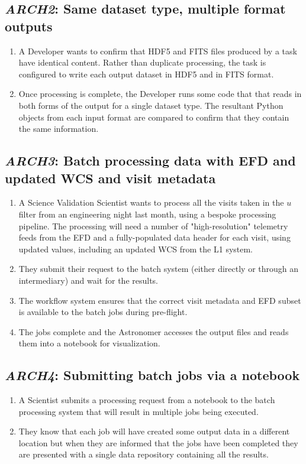 \documentclass[DM,toc,lsstdraft]{lsstdoc}
\newcommand{\usecase}[3]{%
\subsection{\emph{#1}: #2}
\label{use:#1}
\begin{enumerate}[label=\alph*.]
#3
\end{enumerate}
}
\begin{document}
\usecase{ARCH2}{Same dataset type, multiple format outputs}{%

\item
A Developer wants to confirm that HDF5 and FITS files produced by a task have identical content.
Rather than duplicate processing, the task is configured to write each output dataset in HDF5 and in FITS format.

\item
Once processing is complete, the Developer runs some code that that reads in both forms of the output for a single dataset type.
The resultant Python objects from each input format are compared to confirm that they contain the same information.

}

\usecase{ARCH3}{Batch processing data with EFD and updated WCS and visit metadata}{%

\item
A Science Validation Scientist wants to process all the visits taken in the $u$ filter from an engineering night last month, using a bespoke processing pipeline.
The processing will need a number of "high-resolution" telemetry feeds from the EFD and a fully-populated data header for each visit, using updated values, including an updated WCS from the L1 system.

\item
They submit their request to the batch system (either directly or through an intermediary) and wait for the results.

\item
The workflow system ensures that the correct visit metadata and EFD subset is available to the batch jobs during pre-flight.

\item
The jobs complete and the Astronomer accesses the output files and reads them into a notebook for visualization.

}

\usecase{ARCH4}{Submitting batch jobs via a notebook}{%

\item
A Scientist submits a processing request from a notebook to the batch processing system that will result in multiple jobs being executed.

\item
They know that each job will have created some output data in a different location but when they are informed that the jobs have been completed they are presented with a single data repository containing all the results.

}
\end{document}
